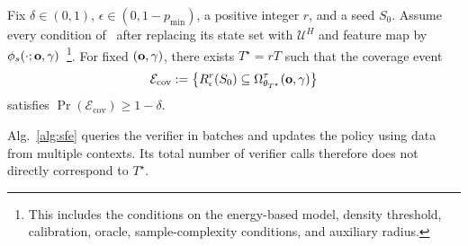 \begin{lemma}
\label{lem:coverage}
Fix $\delta\in(0,1)$, $\epsilon\in(0,1-p_{\min})$, a positive integer $r$, and a seed $S_0$.
Assume every condition of~\cite[Thm.~F.5]{de2026active} after replacing its state set with $\mathcal U^H$ and feature map by $\phi_s(\cdot;\mathbf{o},\gamma)$~\footnote{This includes the conditions on the energy-based model, density threshold, calibration, oracle, sample-complexity conditions, and auxiliary radius.}.
For fixed $(\mathbf{o},\gamma)$, there exists $T^\star=rT$ such that the coverage event
\begin{equation}
\label{eq:coverage}
\mathcal E_{\mathrm{cov}}
:=
\left\{
R_\epsilon^r(S_0)
\subseteq
\Omega_{\theta_{T^\star}}^\tau(\mathbf{o},\gamma)
\right\}
\end{equation}
satisfies
$\Pr(\mathcal E_{\mathrm{cov}})\ge1-\delta$.
\end{lemma}
Alg.~\ref{alg:sfe} queries the verifier in batches and updates the policy using data from multiple contexts.
Its total number of verifier calls therefore does not directly correspond to $T^\star$.
